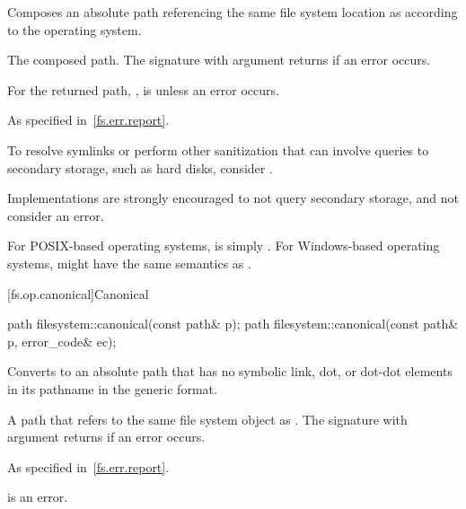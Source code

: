 \begin{itemdescr}
\pnum
\effects
Composes an absolute path referencing the same file system location
as  according to the operating system.

\pnum
\returns
The composed path.
The signature with argument  returns  if an error occurs.

\pnum
\begin{note}
For the returned path, ,  is 
unless an error occurs.
\end{note}

\pnum
\throws
As specified in~\ref{fs.err.report}.

\pnum
\begin{note}
To resolve symlinks
or perform other sanitization that can involve queries to secondary storage,
such as hard disks, consider .
\end{note}

\pnum
\begin{note}
Implementations are strongly encouraged to not query secondary storage,
and not consider  an error.
\end{note}

\pnum
\begin{example}
For POSIX-based operating systems,
 is simply .
For Windows-based operating systems,
 might have the same semantics as .
\end{example}
\end{itemdescr}

[fs.op.canonical]{Canonical}

%
\begin{itemdecl}
path filesystem::canonical(const path& p);
path filesystem::canonical(const path& p, error_code& ec);
\end{itemdecl}

\begin{itemdescr}
\pnum
\effects
Converts  to an absolute
path that has no symbolic link, dot, or dot-dot elements
in its pathname in the generic format.

\pnum
\returns
A path that refers to
the same file system object as .
The signature with argument  returns  if an error occurs.

\pnum
\throws
As specified in~\ref{fs.err.report}.

\pnum
\remarks
{} is an error.
\end{itemdescr}

